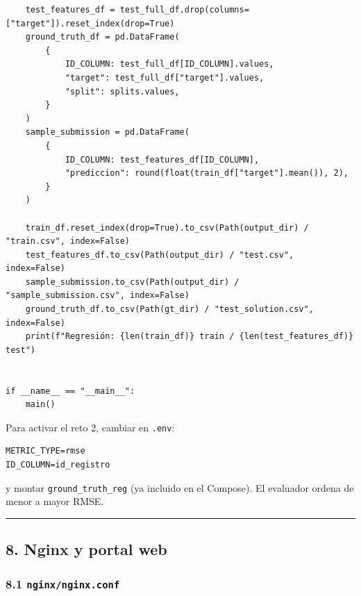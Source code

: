 \documentclass[11pt,a4paper]{article}
\begin{document}
\begin{lstlisting}
    test_features_df = test_full_df.drop(columns=["target"]).reset_index(drop=True)
    ground_truth_df = pd.DataFrame(
        {
            ID_COLUMN: test_full_df[ID_COLUMN].values,
            "target": test_full_df["target"].values,
            "split": splits.values,
        }
    )
    sample_submission = pd.DataFrame(
        {
            ID_COLUMN: test_features_df[ID_COLUMN],
            "prediccion": round(float(train_df["target"].mean()), 2),
        }
    )

    train_df.reset_index(drop=True).to_csv(Path(output_dir) / "train.csv", index=False)
    test_features_df.to_csv(Path(output_dir) / "test.csv", index=False)
    sample_submission.to_csv(Path(output_dir) / "sample_submission.csv", index=False)
    ground_truth_df.to_csv(Path(gt_dir) / "test_solution.csv", index=False)
    print(f"Regresión: {len(train_df)} train / {len(test_features_df)} test")


if __name__ == "__main__":
    main()
\end{lstlisting}

Para activar el reto 2, cambiar en \texttt{.\allowbreak{}env}:

\begin{lstlisting}
METRIC_TYPE=rmse
ID_COLUMN=id_registro
\end{lstlisting}

y montar \texttt{ground\_\allowbreak{}truth\_\allowbreak{}reg} (ya incluido en el Compose). El evaluador ordena de menor a mayor RMSE.

\begin{center}\rule{0.5\linewidth}{0.5pt}\end{center}

\hypertarget{8-nginx-y-portal-web}{%
\subsection{8. Nginx y portal web}\label{8-nginx-y-portal-web}}

\hypertarget{81-nginxnginxconf}{%
\subsubsection{\texorpdfstring{8.1 \texttt{nginx/\allowbreak{}nginx.\allowbreak{}conf}}{8.1 nginx/nginx.conf}}\label{81-nginxnginxconf}}
\end{document}
